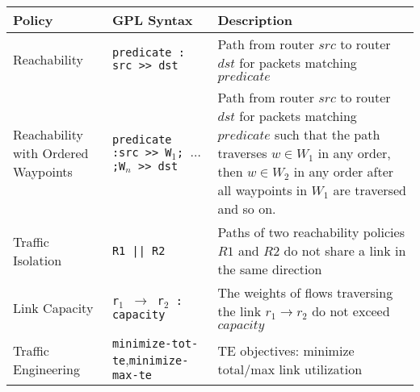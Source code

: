 \begin{table*}[thb]
\begin{small}
	\begin{center}
		\begin{tabular}{m{6em} | m{14em} | m{32em} } 
			Policy &  GPL Syntax & Description \\ 
			\hline
			Reachability & 	\texttt{predicate : src >> dst} & Path from router $src$ to router $dst$ for packets matching $predicate$ \\ \hline
			Reachability with Ordered Waypoints & \texttt{predicate :\newline src >> W$_1$; $\ldots$;W$_n$ >> dst} & Path from router $src$ to router $dst$ for packets matching $predicate$ such that the path traverses $w \in W_1$ in any order, then $w \in W_2$ in any order after all waypoints in $W_1$ are traversed and so on.\\ \hline
			Traffic \newline Isolation & \texttt{R1 || R2} & Paths of two reachability policies $R1$ and $R2$ do not share a link in the same direction \\ \hline
			Link \newline Capacity & \texttt{r$_1$ $\rightarrow$ r$_2$ : capacity}  & The weights of flows traversing the link $r_1 \rightarrow r_2$ do not exceed $capacity$ \\ \hline
			Traffic \newline Engineering & \texttt{minimize-tot-te},\newline \texttt{minimize-max-te} & TE objectives: minimize total/max link utilization \\
		\end{tabular}
	\end{center}
	 \label{tab:policysupport} 
\end{small}
\end{table*}


